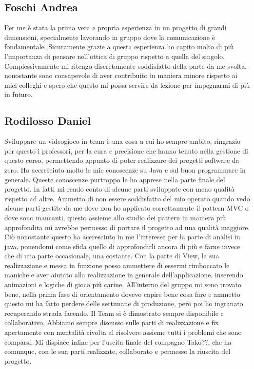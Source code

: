 \documentclass[a4paper,12pt]{report}
\begin{document}
\subsection{Foschi Andrea}
Per me è stata la prima vera e propria esperienza in un progetto di grandi dimensioni, specialmente lavorando in gruppo dove la comunicazione è fondamentale. Sicuramente grazie a questa esperienza ho capito molto di più l’importanza di pensare nell’ottica di gruppo rispetto a quella del singolo. Complessivamente mi ritengo discretamente soddisfatto della parte da me svolta, nonostante sono consapevole di aver contribuito in maniera minore rispetto ai miei colleghi e spero che questo mi possa servire da lezione per impegnarmi di più in futuro.

\subsection{Rodilosso Daniel}
Sviluppare un videogioco in team è una cosa a cui ho sempre ambito, ringrazio per questo i professori, per la cura e precisione che 
hanno tenuto nella gestione di questo corso, permettendo appunto di poter realizzare dei progetti software da zero.
Ho accresciuto molto le mie conoscenze su Java e sul buon programmare in generale.
Queste conoscenze purtroppo le ho apprese nella parte finale del progetto.
In fatti mi rendo conto di alcune parti sviluppate con meno qualità rispetto ad altre.
Ammetto di non essere soddisfatto del mio operato quando vedo alcune parti gestite da me dove non ho applicato correttamente il pattern MVC o dove sono mancanti, questo assieme allo studio dei pattern in maniera più approfondita mi avrebbe permesso di portare il progetto ad una 
qualità maggiore. Ciò nonostante questo ha accresciuto in me l’interesse per la parte di analisi in java, ponendomi come sfida quello di approfondirli ancora 
di più e farne invece che di una parte occasionale, una costante.
Con la parte di View, la sua realizzazione e messa in funzione posso ammettere di essermi rimboccato le maniche e aver aiutato alla 
realizzazione in generale dell’applicazione, inserendo animazioni e logiche di gioco più carine. 
All’interno del gruppo mi sono trovato bene, nella prima fase di orientamento dovevo capire bene cosa fare e ammetto questo mi ha fatto perdere delle settimane di produzione, però poi ho ingranato recuperando strada facendo. Il Team si è dimostrato sempre disponibile e collaborativo,
Abbiamo sempre discusso sulle parti di realizzazione e fix apertamente con mentalità rivolta al risolvere assieme tutti i problemi che sono comparsi. Mi dispiace infine per l’uscita finale del compagno Tako??, che ha comunque, con le sua parti realizzate, collaborato e permesso la riuscita del progetto.
\end{document}
